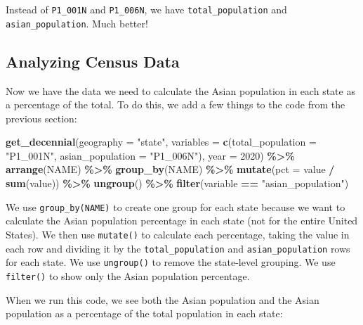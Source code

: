 \documentclass[
]{book}
\newenvironment{Shaded}{\begin{snugshade}}{\end{snugshade}}
\newcommand{\AttributeTok}[1]{\textcolor[rgb]{0.13,0.29,0.53}{#1}}
\newcommand{\DecValTok}[1]{\textcolor[rgb]{0.00,0.00,0.81}{#1}}
\newcommand{\FunctionTok}[1]{\textcolor[rgb]{0.13,0.29,0.53}{\textbf{#1}}}
\newcommand{\NormalTok}[1]{#1}
\newcommand{\SpecialCharTok}[1]{\textcolor[rgb]{0.81,0.36,0.00}{\textbf{#1}}}
\newcommand{\StringTok}[1]{\textcolor[rgb]{0.31,0.60,0.02}{#1}}
\begin{document}
Instead of \texttt{P1\_001N} and \texttt{P1\_006N}, we have \texttt{total\_population} and \texttt{asian\_population}. Much better!

\hypertarget{analyzing-census-data}{%
\subsection*{Analyzing Census Data}\label{analyzing-census-data}}

Now we have the data we need to calculate the Asian population in each state as a percentage of the total. To do this, we add a few things to the code from the previous section:

\begin{Shaded}
\begin{Highlighting}[]
\FunctionTok{get\_decennial}\NormalTok{(}\AttributeTok{geography =} \StringTok{"state"}\NormalTok{, }
              \AttributeTok{variables =} \FunctionTok{c}\NormalTok{(}\AttributeTok{total\_population =} \StringTok{"P1\_001N"}\NormalTok{, }
                            \AttributeTok{asian\_population =} \StringTok{"P1\_006N"}\NormalTok{),}
              \AttributeTok{year =} \DecValTok{2020}\NormalTok{) }\SpecialCharTok{\%\textgreater{}\%} 
  \FunctionTok{arrange}\NormalTok{(NAME) }\SpecialCharTok{\%\textgreater{}\%} 
  \FunctionTok{group\_by}\NormalTok{(NAME) }\SpecialCharTok{\%\textgreater{}\%} 
  \FunctionTok{mutate}\NormalTok{(}\AttributeTok{pct =}\NormalTok{ value }\SpecialCharTok{/} \FunctionTok{sum}\NormalTok{(value)) }\SpecialCharTok{\%\textgreater{}\%} 
  \FunctionTok{ungroup}\NormalTok{() }\SpecialCharTok{\%\textgreater{}\%} 
  \FunctionTok{filter}\NormalTok{(variable }\SpecialCharTok{==} \StringTok{"asian\_population"}\NormalTok{)}
\end{Highlighting}
\end{Shaded}

We use \texttt{group\_by(NAME)} to create one group for each state because we want to calculate the Asian population percentage in each state (not for the entire United States). We then use \texttt{mutate()} to calculate each percentage, taking the value in each row and dividing it by the \texttt{total\_population} and \texttt{asian\_population} rows for each state. We use \texttt{ungroup()} to remove the state-level grouping. We use \texttt{filter()} to show only the Asian population percentage.

When we run this code, we see both the Asian population and the Asian population as a percentage of the total population in each state:
\end{document}
